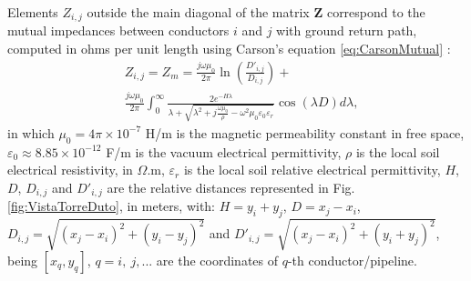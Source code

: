 \documentclass[conference]{IEEEtran}
\begin{document}
Elements $Z_{i,j}$ outside the main diagonal of the matrix $\mathbf{Z}$ correspond to the mutual impedances between conductors $i$ and $j$ with ground return path, computed in ohms per unit length using Carson's equation \eqref{eq:CarsonMutual} \cite{Carson1926}:
\begin{equation}\label{eq:CarsonMutual}
	\begin{aligned}
		&Z_{i,j}=Z_{m}= \frac{j\omega\mu_{0}}{2\pi}\ln\left(\frac{{D}'_{i,j}}{D_{i,j}}\right) + \\
		& \frac{j\omega\mu_{0}}{2\pi}\int_{0}^{\infty}\frac{2e^{-H\lambda}}{\lambda+\sqrt{\lambda^2+j\frac{\omega\mu_{0}}{\rho}-\omega^2\mu_{0}\varepsilon_{0}\varepsilon_{r}}}\cos\left( \lambda D \right) d\lambda,
	\end{aligned}
\end{equation}
in which $\mu_{0}=4\pi\times10^{-7}$ H/m is the magnetic permeability constant in free space, $\varepsilon_{0}\approx 8.85\times10^{-12}$ F/m is the vacuum electrical permittivity, $\rho$ is the local soil electrical resistivity, in $\Omega$.m, $\varepsilon_{r}$ is the local soil relative electrical permittivity, $H$, $D$, $D_{i,j}$ and ${D}'_{i,j}$ are the relative distances represented in Fig. \ref{fig:VistaTorreDuto}, in meters, with: $H=y_i+y_j$, $D=x_j-x_i$, $D_{i,j}=\sqrt{(x_j-x_i)^2+(y_i-y_j)^2}$ and $D'_{i,j}=\sqrt{(x_j-x_i)^2+(y_i+y_j)^2}$, being $[x_q,y_q]$, $q=i,~j,...$ are the coordinates of $q$-th conductor/pipeline.
\end{document}
